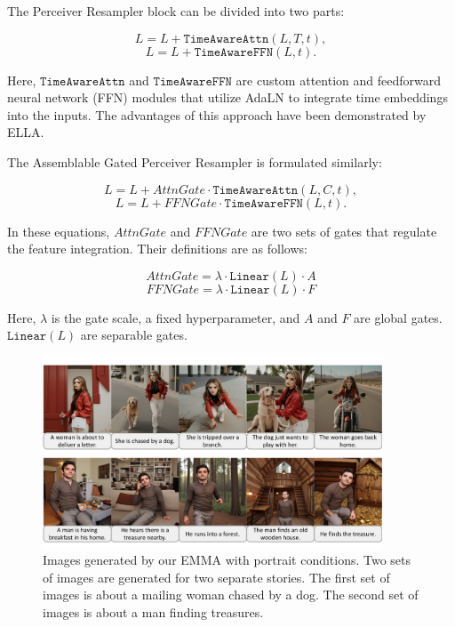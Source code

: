 The Perceiver Resampler block can be divided into two parts:

\begin{equation}
    L = L + \mathtt{TimeAwareAttn}(L, T, t),
\end{equation}
\begin{equation}
    L = L + \mathtt{TimeAwareFFN}(L, t).
\end{equation}

Here, $\mathtt{TimeAwareAttn}$ and $\mathtt{TimeAwareFFN}$ are custom attention and feedforward neural network (FFN) modules that utilize AdaLN to integrate time embeddings into the inputs. The advantages of this approach have been demonstrated by ELLA.

The Assemblable Gated Perceiver Resampler is formulated similarly:

\begin{equation}
    L = L + AttnGate \cdot \mathtt{TimeAwareAttn}(L, C, t),
\end{equation}
\begin{equation}
    L = L + FFNGate \cdot \mathtt{TimeAwareFFN}(L, t).
\end{equation}

In these equations, $AttnGate$ and $FFNGate$ are two sets of gates that regulate the feature integration. Their definitions are as follows:

\begin{equation}
    AttnGate = \lambda \cdot \mathtt{Linear}(L) \cdot A
\end{equation}
\begin{equation}
    FFNGate = \lambda \cdot \mathtt{Linear}(L) \cdot F
\end{equation}

Here, $\lambda$ is the gate scale, a fixed hyperparameter, and $A$ and $F$ are global gates. $\mathtt{Linear}(L)$ are separable gates. 





\begin{figure}[t]
    \centering
    \includegraphics[width=0.9\textwidth]{images/Story_diffusion.pdf}
    \caption{Images generated by our EMMA with portrait conditions. Two sets of images are generated for two separate stories. The first set of images is about a mailing woman chased by a dog. The second set of images is about a man finding treasures.}
    \label{fig:story_diffusion}
\end{figure}

